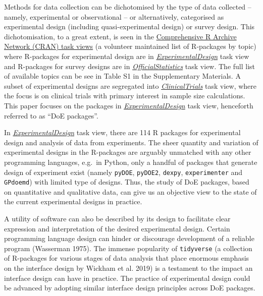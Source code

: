 \documentclass{article}
\begin{document}
Methods for data collection can be dichotomised by the type of data
collected -- namely, experimental or observational -- or alternatively,
categorised as experimental design (including quasi-experimental design)
or survey design. This dichotomisation, to a great extent, is seen in
the \href{https://cran.r-project.org/web/views/}{Comprehensive R Archive
Network (CRAN) task views} (a volunteer maintained list of R-packages by
topic) where R-packages for experimental design are in
\href{http://CRAN.R-project.org/view=ExperimentalDesign}{\emph{ExperimentalDesign}}
task view and R-packages for survey designs are in
\href{http://CRAN.R-project.org/view=OfficialStatistics}{\emph{OfficialStatistics}}
task view. The full list of available topics can be see in Table S1 in
the Supplementary Materials. A subset of experimental designs are
segregated into
\href{http://CRAN.R-project.org/view=ClinicalTrials}{\emph{ClinicalTrials}}
task view, where the focus is on clinical trials with primary interest
in sample size calculations. This paper focuses on the packages in
\href{http://CRAN.R-project.org/view=ExperimentalDesign}{\emph{ExperimentalDesign}}
task view, henceforth referred to as ``DoE packages''.

In
\href{http://CRAN.R-project.org/view=ExperimentalDesign}{\emph{ExperimentalDesign}}
task view, there are 114 R packages for experimental design and analysis
of data from experiments. The sheer quantity and variation of
experimental designs in the R-packages are arguably unmatched with any
other programming languages, e.g.~in Python, only a handful of packages
that generate design of experiment exist (namely \texttt{pyDOE},
\texttt{pyDOE2}, \texttt{dexpy}, \texttt{experimenter} and
\texttt{GPdoemd}) with limited type of designs. Thus, the study of DoE
packages, based on quantitative and qualitative data, can give us an
objective view to the state of the current experimental designs in
practice.

A utility of software can also be described by its design to facilitate
clear expression and interpretation of the desired experimental design.
Certain programming language design can hinder or discourage development
of a reliable program (Wasserman 1975). The immense popularity of
\texttt{tidyverse} (a collection of R-packages for various stages of
data analysis that place enormous emphasis on the interface design by
Wickham et al. 2019) is a testament to the impact an interface design
can have in practice. The practice of experimental design could be
advanced by adopting similar interface design principles across DoE
packages.
\end{document}
